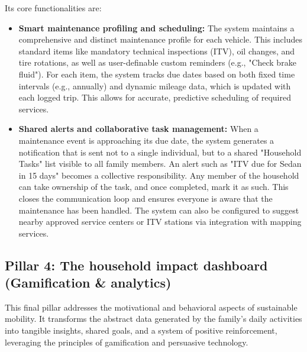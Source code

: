 Its core functionalities are:
\begin{itemize}
    \item \textbf{Smart maintenance profiling and scheduling:} The system maintains a comprehensive and distinct maintenance profile for each vehicle. This includes standard items like mandatory technical inspections (ITV), oil changes, and tire rotations, as well as user-definable custom reminders (e.g., "Check brake fluid"). For each item, the system tracks due dates based on both fixed time intervals (e.g., annually) and dynamic mileage data, which is updated with each logged trip. This allows for accurate, predictive scheduling of required services.
    
    \textgap
    
    \item \textbf{Shared alerts and collaborative task management:} When a maintenance event is approaching its due date, the system generates a notification that is sent not to a single individual, but to a shared "Household Tasks" list visible to all family members. An alert such as "ITV due for Sedan in 15 days" becomes a collective responsibility. Any member of the household can take ownership of the task, and once completed, mark it as such. This closes the communication loop and ensures everyone is aware that the maintenance has been handled. The system can also be configured to suggest nearby approved service centers or ITV stations via integration with mapping services.
\end{itemize}

\subsection{Pillar 4: The household impact dashboard (Gamification \& analytics)}

This final pillar addresses the motivational and behavioral aspects of sustainable mobility. It transforms the abstract data generated by the family's daily activities into tangible insights, shared goals, and a system of positive reinforcement, leveraging the principles of gamification and persuasive technology.

\textgap

